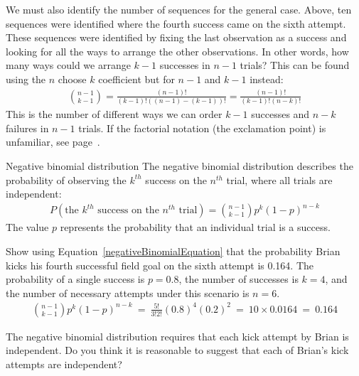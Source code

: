 We must also identify the number of sequences for the general case. Above, ten sequences were identified where the fourth success came on the sixth attempt. These sequences were identified by fixing the last observation as a success and looking for all the ways to arrange the other observations. In other words, how many ways could we arrange $k-1$ successes in $n-1$ trials? This can be found using the $n$ choose $k$ coefficient but for $n-1$ and $k-1$ instead:
\begin{eqnarray*}
{n-1 \choose k-1} = \frac{(n-1)!}{(k-1)! \left((n-1) - (k-1)\right)!} = \frac{(n-1)!}{(k-1)! \left(n - k\right)!}
\end{eqnarray*}
This is the number of different ways we can order $k-1$ successes and $n-k$ failures in $n-1$ trials. If the factorial notation (the exclamation point) is unfamiliar, see page~\pageref{factorialDefinitionInTheBinomialSection}.

\begin{onebox}{Negative binomial distribution}
  The negative binomial distribution describes the
  probability of observing the $k^{th}$ success on
  the $n^{th}$ trial, where all trials are independent:
  \begin{eqnarray}
  P(\text{the $k^{th}$ success on the $n^{th}$ trial})
      = {n-1 \choose k-1} p^{k}(1-p)^{n-k}
  \label{negativeBinomialEquation}
  \end{eqnarray}
  The value $p$ represents the probability that
  an individual trial is a success.
\end{onebox}

\begin{examplewrap}
\begin{nexample}{Show using Equation~\eqref{negativeBinomialEquation} that the probability Brian kicks his fourth successful field goal on the sixth attempt is 0.164.}
The probability of a single success is $p=0.8$, the number of successes is $k=4$, and the number of necessary attempts under this scenario is $n=6$.
\begin{align*}
{n-1 \choose k-1}p^k(1-p)^{n-k}\ 
	=\ \frac{5!}{3!2!} (0.8)^4 (0.2)^2\ 
	=\ 10\times 0.0164\ 
	=\ 0.164
\end{align*}
\end{nexample}
\end{examplewrap}

\begin{exercisewrap}
\begin{nexercise}
The negative binomial distribution requires that each kick attempt by Brian is independent. Do you think it is reasonable to suggest that each of Brian's kick attempts are independent?\footnotemark
\end{nexercise}
\end{exercisewrap}

